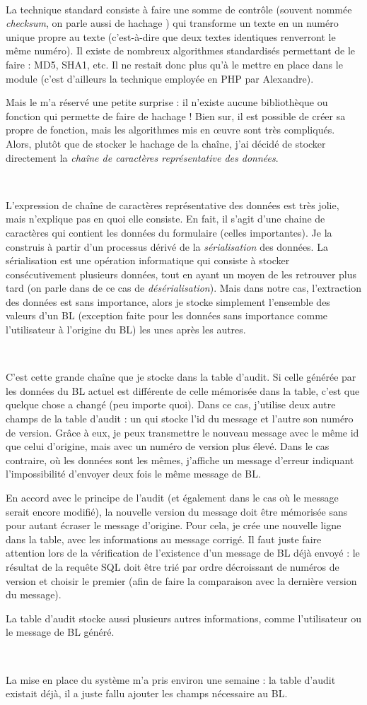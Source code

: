 ~

La technique standard consiste à faire une somme de contrôle (souvent nommée \emph{checksum}, on parle aussi de \og hachage \fg) qui transforme un texte en un numéro unique propre au texte (c'est-à-dire que deux textes identiques renverront le même numéro). Il existe de nombreux algorithmes standardisés permettant de le faire : MD5, SHA1, etc. Il ne restait donc plus qu'à le mettre en place dans le module (c'est d'ailleurs la technique employée en PHP par Alexandre).

Mais le \vb{} m'a réservé une petite surprise : il n'existe aucune bibliothèque ou fonction qui permette de faire de hachage ! Bien sur, il est possible de créer sa propre de fonction, mais les algorithmes mis en \oe{uvre} sont très compliqués. Alors, plutôt que de stocker le hachage de la chaîne, j'ai décidé de stocker directement la \emph{chaîne de caractères représentative des données}.

~

L'expression de \og chaîne de caractères représentative des données \fg{} est très jolie, mais n'explique pas en quoi elle consiste. En fait, il s'agit d'une chaine de caractères qui contient les données du formulaire (celles importantes). Je la construis à partir d'un processus dérivé de la \emph{sérialisation} des données. La sérialisation est une opération informatique qui consiste à stocker consécutivement plusieurs données, tout en ayant un moyen de les retrouver plus tard (on parle dans de ce cas de \emph{désérialisation}). Mais dans notre cas, l'extraction des données est sans importance, alors je stocke simplement l'ensemble des valeurs d'un BL (exception faite pour les données sans importance comme l'utilisateur à l'origine du BL) les unes après les autres.

~

C'est cette grande chaîne que je stocke dans la table d'audit. Si celle générée par les données du BL actuel est différente de celle mémorisée dans la table, c'est que quelque chose a changé (peu importe quoi). Dans ce cas, j'utilise deux autre champs de la table d'audit : un qui stocke l'id du message et l'autre son numéro de version. Grâce à eux, je peux transmettre le nouveau message avec le même id que celui d'origine, mais avec un numéro de version plus élevé.
Dans le cas contraire, où les données sont les mêmes, j'affiche un message d'erreur indiquant l'impossibilité d'envoyer deux fois le même message de BL.
~

En accord avec le principe de l'audit (et également dans le cas où le message serait encore modifié), la nouvelle version du message doit être mémorisée sans pour autant écraser le message d'origine. Pour cela, je crée une nouvelle ligne dans la table, avec les informations au message corrigé. Il faut juste faire attention lors de la vérification de l'existence d'un message de BL déjà envoyé : le résultat de la requête SQL doit être trié par ordre décroissant de numéros de version et choisir le premier (afin de faire la comparaison avec la dernière version du message).

La table d'audit stocke aussi plusieurs autres informations, comme l'utilisateur ou le message de BL généré.

~

La mise en place du système m'a pris environ une semaine : la table d'audit existait déjà, il a juste fallu ajouter les champs nécessaire au BL.
